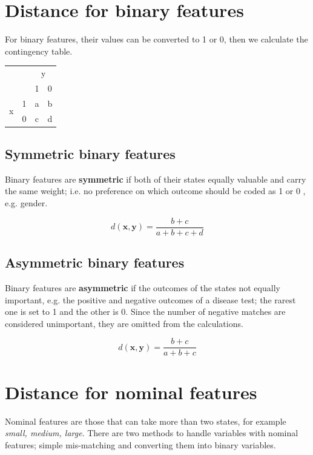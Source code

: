 \documentclass[11pt,fleqn]{book} %
\begin{document}
\section{Distance for binary features}
For binary features, their values can be converted to 1 or 0, then we calculate the contingency table.

\begin{table}[h]
\centering
\begin{tabular}{cccc}
\multicolumn{2}{c}{\multirow{2}{*}{}}       & \multicolumn{2}{c}{y} \\
\multicolumn{2}{c}{}                        & 1         & 0         \\ \cline{2-4}
\multirow{2}{*}{x} & \multicolumn{1}{c|}{1} & a         & b         \\
                   & \multicolumn{1}{c|}{0} & c         & d
\end{tabular}
\end{table}

\subsection*{Symmetric binary features}
Binary features are \textbf{symmetric} if both of their states equally valuable and carry the same weight; i.e. no
preference on which outcome should be coded as 1 or 0 , e.g. gender.

\begin{center}
	$$d(\mathbf{x}, \mathbf{y}) = \frac{b + c}{a + b + c + d}$$
\end{center}


\subsection*{Asymmetric binary features}
Binary features are \textbf{asymmetric} if the outcomes of the states not equally important, e.g. the positive and negative
outcomes of a disease test; the rarest one is set to 1 and the other is 0. Since the number of negative matches are considered unimportant, they are omitted from the calculations.

\begin{center}
	$$d(\mathbf{x}, \mathbf{y}) = \frac{b + c}{a + b + c}$$
\end{center}

\section{Distance for nominal features}
Nominal features are those that can take more than two states, for example {\textit{small, medium, large}}. There are two methods to handle variables with nominal features; simple mis-matching and converting them into binary variables.
\end{document}
